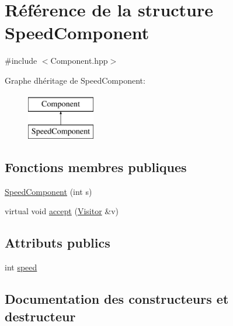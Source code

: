 \hypertarget{structSpeedComponent}{}\section{Référence de la structure Speed\+Component}
\label{structSpeedComponent}


{\ttfamily \#include $<$Component.\+hpp$>$}

Graphe d\textquotesingle{}héritage de Speed\+Component\+:\begin{figure}[H]
\begin{center}
\leavevmode
\includegraphics[height=2.000000cm]{structSpeedComponent}
\end{center}
\end{figure}
\subsection*{Fonctions membres publiques}
\begin{DoxyCompactItemize}
\item 
\hyperlink{structSpeedComponent_ac1fd46b8ddbb87e266d8813d9ed82145}{Speed\+Component} (int s)
\item 
virtual void \hyperlink{structSpeedComponent_a6857d2108ab631e63a9040bf77a8b366}{accept} (\hyperlink{classVisitor}{Visitor} \&v)
\end{DoxyCompactItemize}
\subsection*{Attributs publics}
\begin{DoxyCompactItemize}
\item 
int \hyperlink{structSpeedComponent_aedd25677bc7888cab4eac92c444e0cdb}{speed}
\end{DoxyCompactItemize}


\subsection{Documentation des constructeurs et destructeur}
\mbox{\label{structSpeedComponent_ac1fd46b8ddbb87e266d8813d9ed82145}} 
